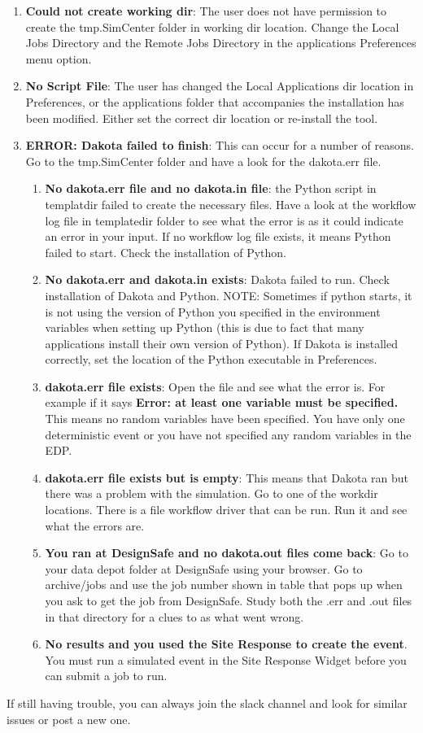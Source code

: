 \begin{enumerate}
\item \textbf{Could not create working dir}: The user does not have permission to create the tmp.SimCenter folder in working dir location. Change the Local Jobs Directory and the Remote Jobs Directory in the applications Preferences menu option. 
\item \textbf{No Script File}: The user has changed the Local Applications dir location in Preferences, or the applications folder that accompanies the installation has been modified. Either set the correct dir location or re-install the tool.
\item \textbf{ERROR: Dakota failed to finish}: This can occur for a number of reasons. Go to the tmp.SimCenter folder and have a look for the dakota.err file.
\begin{enumerate}
\item \textbf{No dakota.err file and no dakota.in file}: the Python script in templatdir failed to create the necessary files. Have a look at the workflow log file in templatedir folder to see what the error is as it could indicate an error in your input. If no workflow log file exists, it means Python failed to start. Check the installation of Python.
\item \textbf{No dakota.err and dakota.in exists}: Dakota failed to run. Check installation of Dakota and Python. NOTE: Sometimes if python starts, it is not using the version of Python you specified in the environment variables when setting up Python (this is due to fact that many applications install their own version of Python). If Dakota is installed correctly, set the location of the Python executable in Preferences.
\item \textbf{dakota.err file exists}: Open the file and see what the error is.  For example if it says \textbf{Error: at least one variable must be specified.} This means no random variables have been specified. You have only one deterministic event or you have not specified any random variables in the EDP.
\item \textbf{dakota.err file exists but is empty}: This means that Dakota ran but there was a problem with the simulation. Go to one of the workdir locations. There is a file workflow driver that can be run. Run it and see what the errors are.
\item \textbf{You ran at DesignSafe and no dakota.out files come back}: Go to your data depot folder at DesignSafe using your browser. Go to archive/jobs and use the job number shown in table that pops up when you ask to get the job from DesignSafe. Study both the .err and .out files in that directory for a clues to as what went wrong.
\item \textbf{No results and you used the Site Response to create the event}. You must run a simulated event in the Site Response Widget before you can submit a job to run.
\end{enumerate}
\end{enumerate}

If still having trouble, you can always join the \texttt{\getsoftwarename{}} slack channel and look for similar issues or post a new one.

